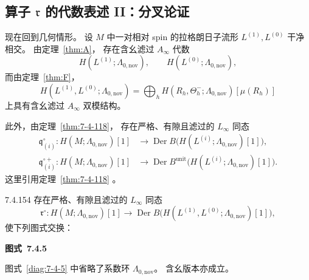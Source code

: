 
\subsection{算子 $\mathfrak r$ 的代数表述 II：分叉论证}
\label{subsec:7-4-8}

现在回到几何情形。
设 $M$ 中一对相对 spin 的拉格朗日子流形
$L^{(1)},L^{(0)}$ 干净相交。
由定理~\ref{thm:A}，
存在含幺滤过 $A_\infty$ 代数
\[
H(L^{(1)};\Lambda_{0,\mathrm{nov}}),
\qquad
H(L^{(0)};\Lambda_{0,\mathrm{nov}}),
\]
而由定理~\ref{thm:F}，
\begin{equation*}
H(L^{(1)},L^{(0)};\Lambda_{0,\mathrm{nov}})
=
\bigoplus_h
H(R_h,\Theta^-_h;\Lambda_{0,\mathrm{nov}})
[\mu(R_h)]
\end{equation*}
上具有含幺滤过 $A_\infty$ 双模结构。

此外，由定理~\ref{thm:7-4-118}，
存在严格、有隙且滤过的 $L_\infty$ 同态
\[
\begin{aligned}
\mathfrak q^\circ_{(i)}\colon
H(M;\Lambda_{0,\mathrm{nov}})[1]
&\longrightarrow
\operatorname{Der}B
\bigl(H(L^{(i)};\Lambda_{0,\mathrm{nov}})[1]\bigr),\\
\mathfrak q^{\circ+}_{(i)}\colon
H(M;\Lambda_{0,\mathrm{nov}})[1]
&\longrightarrow
\operatorname{Der}B^{\mathrm{unit}}
\bigl(H(L^{(i)};\Lambda_{0,\mathrm{nov}})[1]\bigr).
\end{aligned}
\]
这里引用定理~\ref{thm:7-4-118}
。

\begin{theorem}{7.4.154}\label{thm:7-4-154}
存在严格、有隙且滤过的 $L_\infty$ 同态
\[
\mathfrak r^\circ\colon
H(M;\Lambda_{0,\mathrm{nov}})[1]
\longrightarrow
\operatorname{Der}B
\bigl(
H(L^{(1)},L^{(0)};\Lambda_{0,\mathrm{nov}})[1]
\bigr),
\]
使下列图式交换：

\par\medskip\noindent\begin{minipage}{\textwidth}
\centering
{}
\par\smallskip
{\renewcommand{\thefigure}{7.4.5}
\normalfont\bfseries 图式~\thefigure\label{diag:7-4-5}}
\end{minipage}\par\medskip

图式~\ref{diag:7-4-5} 中省略了系数环
$\Lambda_{0,\mathrm{nov}}$。
含幺版本亦成立。
\end{theorem}

